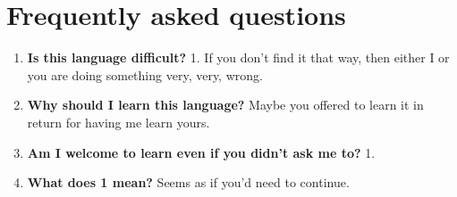 \chapter{Frequently asked questions}

\newcommand{\qa}[2]{\item \textbf{#1} #2 \\}

\begin{enumerate}
  \qa{Is this language difficult?}{1. If you don't find it that way, then either I or you are doing something very, very, wrong.}
  \qa{Why should I learn this language?}{Maybe you offered to learn it in return for having me learn yours.}
  \qa{Am I welcome to learn even if you didn't ask me to?}{1.}
  \qa{What does 1 mean?}{Seems as if you'd need to continue.}
\end{enumerate}

